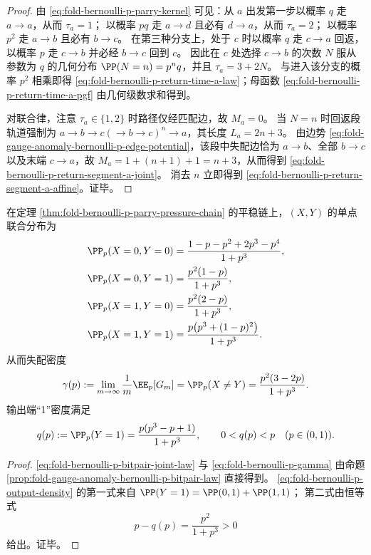 \begin{proof}
由 \eqref{eq:fold-bernoulli-p-parry-kernel} 可见：从 \(a\) 出发第一步以概率 \(q\) 走 \(a\to a\)，从而 \(\tau_a=1\)；
以概率 \(pq\) 走 \(a\to d\) 且必有 \(d\to a\)，从而 \(\tau_a=2\)；
以概率 \(p^2\) 走 \(a\to b\) 且必有 \(b\to c\)。
在第三种分支上，处于 \(c\) 时以概率 \(q\) 走 \(c\to a\) 回返，以概率 \(p\) 走 \(c\to b\) 并必经 \(b\to c\) 回到 \(c\)。
因此在 \(c\) 处选择 \(c\to b\) 的次数 \(N\) 服从参数为 \(q\) 的几何分布 \(\PP(N=n)=p^n q\)，并且 \(\tau_a=3+2N\)。
与进入该分支的概率 \(p^2\) 相乘即得 \eqref{eq:fold-bernoulli-p-return-time-a-law}；母函数 \eqref{eq:fold-bernoulli-p-return-time-a-pgf} 由几何级数求和得到。

对联合律，注意 \(\tau_a\in\{1,2\}\) 时路径仅经匹配边，故 \(M_a=0\)。
当 \(N=n\) 时回返段轨道强制为
\(
a\to b\to c(\to b\to c)^n\to a
\)，其长度 \(L_a=2n+3\)。
由边势 \eqref{eq:fold-gauge-anomaly-bernoulli-p-edge-potential}，该段中失配边恰为 \(a\to b\)、全部 \(b\to c\) 以及末端 \(c\to a\)，故 \(M_a=1+(n+1)+1=n+3\)，从而得到 \eqref{eq:fold-bernoulli-p-return-segment-a-joint}。
消去 \(n\) 立即得到 \eqref{eq:fold-bernoulli-p-return-segment-a-affine}。证毕。
\end{proof}

\begin{theorem}\label{thm:fold-bernoulli-p-bitpair-gamma-q-closed}
在定理 \ref{thm:fold-bernoulli-p-parry-pressure-chain} 的平稳链上，\((X,Y)\) 的单点联合分布为
\begin{align}
\PP_p(X=0,Y=0)&=\frac{1-p-p^2+2p^3-p^4}{1+p^3},\nonumber\\
\PP_p(X=0,Y=1)&=\frac{p^2(1-p)}{1+p^3},\nonumber\\
\PP_p(X=1,Y=0)&=\frac{p^2(2-p)}{1+p^3},\label{eq:fold-bernoulli-p-bitpair-joint-law}\\
\PP_p(X=1,Y=1)&=\frac{p\bigl(p^3+(1-p)^2\bigr)}{1+p^3}. \nonumber
\end{align}
从而失配密度
\begin{equation}\label{eq:fold-bernoulli-p-gamma}
\gamma(p):=\lim_{m\to\infty}\frac1m\EE_p[G_m]
=\PP_p(X\neq Y)
=\frac{p^2(3-2p)}{1+p^3}.
\end{equation}
输出端“1”密度满足
\begin{equation}\label{eq:fold-bernoulli-p-output-density}
q(p):=\PP_p(Y=1)
=\frac{p(p^3-p+1)}{1+p^3},
\qquad
0<q(p)<p\quad(p\in(0,1)).
\end{equation}
\end{theorem}
\begin{proof}
\eqref{eq:fold-bernoulli-p-bitpair-joint-law} 与
\eqref{eq:fold-bernoulli-p-gamma}
由命题 \ref{prop:fold-gauge-anomaly-bernoulli-p-bitpair-law} 直接得到。
\eqref{eq:fold-bernoulli-p-output-density} 的第一式来自
\(
\PP(Y=1)=\PP(0,1)+\PP(1,1)
\)；
第二式由恒等式
\[
p-q(p)=\frac{p^2}{1+p^3}>0
\]
给出。证毕。
\end{proof}

